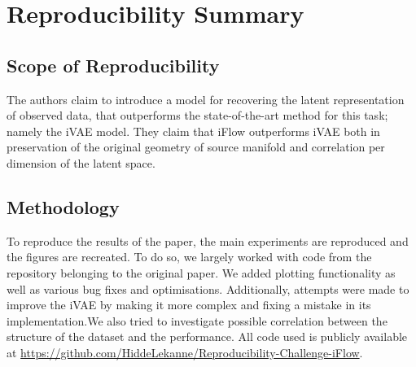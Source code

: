 \vspace{-3em} 

\section*{\centering Reproducibility Summary}


\subsection*{Scope of Reproducibility}
The authors claim to introduce a model for recovering the latent representation of observed data, that outperforms the state-of-the-art method for this task; namely the iVAE model. They claim that iFlow outperforms iVAE both in preservation of the original geometry of source manifold and correlation per dimension of the latent space. 

\subsection*{Methodology}
To reproduce the results of the paper, the main experiments are reproduced and the figures are recreated.
To do so, we largely worked with code from the repository belonging to the original paper. We added plotting functionality as well as various bug fixes and optimisations. Additionally, attempts were made to improve the iVAE by making it more complex and fixing a mistake in its implementation.We also tried to investigate possible correlation between the structure of the dataset and the performance. All code used is publicly available at \url{https://github.com/HiddeLekanne/Reproducibility-Challenge-iFlow}. 

